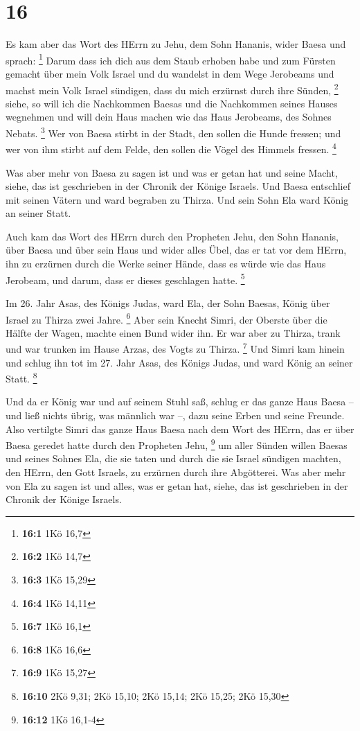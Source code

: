 \hypertarget{section-5}{%
\section{16}\label{section-5}}

 Es kam aber das Wort des HErrn zu Jehu, dem Sohn Hananis,
wider Baesa und sprach: \footnote{\textbf{16:1} 1Kö 16,7} 
Darum dass ich dich aus dem Staub erhoben habe und zum Fürsten gemacht
über mein Volk Israel und du wandelst in dem Wege Jerobeams und machst
mein Volk Israel sündigen, dass du mich erzürnst durch ihre Sünden,
\footnote{\textbf{16:2} 1Kö 14,7}  siehe, so will ich die
Nachkommen Baesas und die Nachkommen seines Hauses wegnehmen und will
dein Haus machen wie das Haus Jerobeams, des Sohnes Nebats. \footnote{\textbf{16:3}
  1Kö 15,29}  Wer von Baesa stirbt in der Stadt, den sollen
die Hunde fressen; und wer von ihm stirbt auf dem Felde, den sollen die
Vögel des Himmels fressen. \footnote{\textbf{16:4} 1Kö 14,11}

 Was aber mehr von Baesa zu sagen ist und was er getan hat
und seine Macht, siehe, das ist geschrieben in der Chronik der Könige
Israels.  Und Baesa entschlief mit seinen Vätern und ward
begraben zu Thirza. Und sein Sohn Ela ward König an seiner Statt.

 Auch kam das Wort des HErrn durch den Propheten Jehu, den
Sohn Hananis, über Baesa und über sein Haus und wider alles Übel, das er
tat vor dem HErrn, ihn zu erzürnen durch die Werke seiner Hände, dass es
würde wie das Haus Jerobeam, und darum, dass er dieses geschlagen hatte.
\footnote{\textbf{16:7} 1Kö 16,1}

 Im 26. Jahr Asas, des Königs Judas, ward Ela, der Sohn
Baesas, König über Israel zu Thirza zwei Jahre. \footnote{\textbf{16:8}
  1Kö 16,6}  Aber sein Knecht Simri, der Oberste über die
Hälfte der Wagen, machte einen Bund wider ihn. Er war aber zu Thirza,
trank und war trunken im Hause Arzas, des Vogts zu Thirza. \footnote{\textbf{16:9}
  1Kö 15,27}  Und Simri kam hinein und schlug ihn tot im
27. Jahr Asas, des Königs Judas, und ward König an seiner Statt.
\footnote{\textbf{16:10} 2Kö 9,31; 2Kö 15,10; 2Kö 15,14; 2Kö 15,25; 2Kö
  15,30}

 Und da er König war und auf seinem Stuhl saß, schlug er
das ganze Haus Baesa -- und ließ nichts übrig, was männlich war --, dazu
seine Erben und seine Freunde.  Also vertilgte Simri das
ganze Haus Baesa nach dem Wort des HErrn, das er über Baesa geredet
hatte durch den Propheten Jehu, \footnote{\textbf{16:12} 1Kö 16,1-4}
 um aller Sünden willen Baesas und seines Sohnes Ela, die
sie taten und durch die sie Israel sündigen machten, den HErrn, den Gott
Israels, zu erzürnen durch ihre Abgötterei.  Was aber mehr
von Ela zu sagen ist und alles, was er getan hat, siehe, das ist
geschrieben in der Chronik der Könige Israels.

